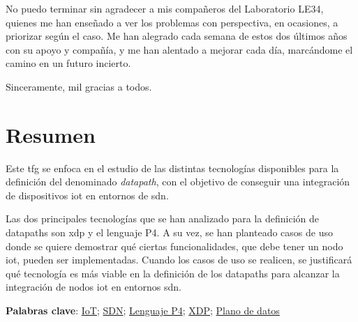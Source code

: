 No puedo terminar sin agradecer a mis compañeros del Laboratorio LE34, quienes me han enseñado a ver los problemas con perspectiva, en ocasiones, a priorizar según el caso. Me han alegrado cada semana de estos dos últimos años con su apoyo y compañía, y  me han alentado a mejorar cada día, marcándome el camino en un futuro incierto.

\vspace{0.5cm}

Sinceramente, mil gracias a todos.




\cleardoublepage %



\chapter{Resumen}
\thispagestyle{empty}
Este \gls{tfg} se enfoca en el estudio de las distintas tecnologías disponibles para la definición del denominado \textit{datapath}, con el objetivo de conseguir una integración de dispositivos \gls{iot} en entornos de \gls{sdn}. \newline

Las dos principales tecnologías que se han analizado para la definición de datapaths son \gls{xdp} y el lenguaje P4. A su vez, se han planteado casos de uso donde se quiere demostrar qué ciertas funcionalidades, que debe tener un nodo \gls{iot}, pueden ser implementadas. Cuando los casos de uso se realicen, se justificará qué tecnología es más viable en la definición de los datapaths para alcanzar la integración de nodos \gls{iot} en entornos \gls{sdn}.

\vspace{1cm}

\textbf{Palabras clave}: \href{https://scholar.google.es/scholar?q=Internet+of+Things}{IoT}; \href{https://www.opennetworking.org/sdn-definition}{SDN};
\href{https://p4.org/}{Lenguaje P4}; \href{https://scholar.google.es/scholar?q=XDP+linux}{XDP};
\href{https://scholar.google.es/scholar?q=Datapaths}{Plano de datos}


\cleardoublepage %



